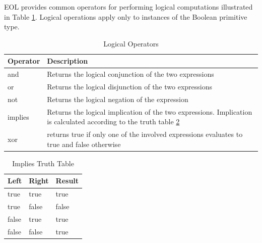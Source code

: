 EOL provides common operators for performing logical computations illustrated in Table \ref{tab:LogicalOperators}. Logical operations apply only to instances of the Boolean primitive type.


\begin{longtable} {|p{5.5cm}|p{6.5cm}|}
			
			\caption{Logical Operators}
			\label{tab:LogicalOperators}\\
			
			\hline
							
			\textbf{Operator} & \textbf{Description} \\\hline

			and & Returns the logical conjunction of the two expressions \\\hline
			
			or & Returns the logical disjunction of the two expressions \\\hline
			
			not & Returns the logical negation of the expression \\\hline
			
			implies & Returns the logical implication of the two expressions. Implication is calculated according to the truth table \ref{tab:ImpliesTruthTable} \\\hline
			
			xor & returns true if only one of the involved expressions evaluates to true  and false otherwise \\\hline
	
\end{longtable}
	
\begin{longtable} {|l|l|l|} 
	
	\caption{Implies Truth Table}
	\label{tab:ImpliesTruthTable}\\
	
	\hline
		\textbf{Left} & \textbf{Right} & \textbf{Result} \\\hline
		true & true & true \\\hline
		true & false & false \\\hline
		false & true & true \\\hline
		false & false & true \\\hline			

\end{longtable}

